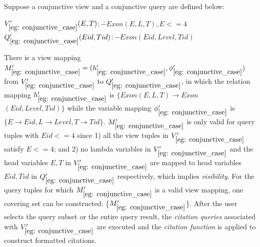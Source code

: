 \begin{example}\label{eg: conjunctive_case}
Suppose a conjunctive view and a conjunctive query are defined below:
\begin{tabbing}
$V_{\ref{eg: conjunctive_case}}'(E, T)$\hspace{0.05em}\=$:-$\=$ Exon(E, L, T), E <= 4$\\
$Q_{\ref{eg: conjunctive_case}}'(Eid, Tid) $\hspace{0.05em}$:- Exon(Eid, Level, Tid)$
\end{tabbing}
There is a view mapping $M_{\ref{eg: conjunctive_case}}' = (h_{\ref{eg: conjunctive_case}}', \phi_{\ref{eg: conjunctive_case}}')$ from $V_{\ref{eg: conjunctive_case}}'$ to $Q_{\ref{eg: conjunctive_case}}'$, in which the relation mapping $h_{\ref{eg: conjunctive_case}}'$ is $\{Exon(E, L, T) \rightarrow Exon$ $(Eid, Level, Tid)\}$ while the variable mapping $\phi_{\ref{eg: conjunctive_case}}'$ is $\{E\rightarrow Eid, L \rightarrow Level, T\rightarrow Tid\}$. $M_{\ref{eg: conjunctive_case}}'$ is only valid for query tuples with $Eid <= 4$ since 1) all the view tuples in $V_{\ref{eg: conjunctive_case}}'$ satisfy $E <= 4$; and 2) no lambda variables in $V_{\ref{eg: conjunctive_case}}'$ and the head variables $E, T$ in $V_{\ref{eg: conjunctive_case}}'$ are mapped to head variables $Eid, Tid$ in $Q_{\ref{eg: conjunctive_case}}'$ respectively, which implies {\em visibility}. For the query tuples for which $M_{\ref{eg: conjunctive_case}}'$ is a valid view mapping, one covering set can be constructed:  \{$M_{\ref{eg: conjunctive_case}}'$\}. After the user selects the query subset or the entire query result,  the \textit{citation queries} associated with $V_{\ref{eg: conjunctive_case}}'$ are executed and the {\em citation function} is applied to construct formatted citations.
\end{example}





